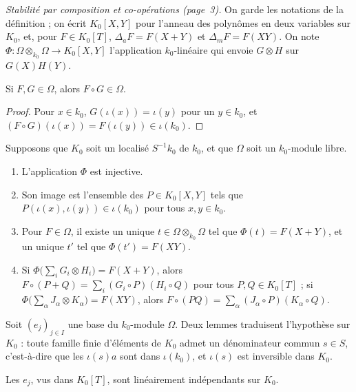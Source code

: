 \medskip
\noindent\textit{Stabilité par composition et co-opérations (page~3).} On garde les notations de la définition ; on écrit $K_0[X, Y]$ pour l'anneau des polynômes en deux variables sur $K_0$, et, pour $F \in K_0[T]$, $\Delta_a F = F(X + Y)$ et $\Delta_m F = F(XY)$. On note $\Phi : \Omega \otimes_{k_0} \Omega \to K_0[X, Y]$ l'application $k_0$-linéaire qui envoie $G \otimes H$ sur $G(X) H(Y)$.

\begin{enonce}
Si $F, G \in \Omega$, alors $F \circ G \in \Omega$.
\end{enonce}

\begin{proof}
Pour $x \in k_0$, $G(\iota(x)) = \iota(y)$ pour un $y \in k_0$, et $(F \circ G)(\iota(x)) = F(\iota(y)) \in \iota(k_0)$.
\end{proof}

\begin{enonce}
Supposons que $K_0$ soit un localisé $S^{-1} k_0$ de $k_0$, et que $\Omega$ soit un $k_0$-module libre.
\begin{enumerate}
\item L'application $\Phi$ est injective.
\item Son image est l'ensemble des $P \in K_0[X, Y]$ tels que $P(\iota(x), \iota(y)) \in \iota(k_0)$ pour tous $x, y \in k_0$.
\item Pour $F \in \Omega$, il existe un unique $t \in \Omega \otimes_{k_0} \Omega$ tel que $\Phi(t) = F(X + Y)$, et un unique $t'$ tel que $\Phi(t') = F(XY)$.
\item Si $\Phi\bigl(\sum_i G_i \otimes H_i\bigr) = F(X + Y)$, alors $F \circ (P + Q) = \sum_i (G_i \circ P)(H_i \circ Q)$ pour tous $P, Q \in K_0[T]$ ; si $\Phi\bigl(\sum_\alpha J_\alpha \otimes K_\alpha\bigr) = F(XY)$, alors $F \circ (PQ) = \sum_\alpha (J_\alpha \circ P)(K_\alpha \circ Q)$.
\end{enumerate}
\end{enonce}

Soit $(e_j)_{j \in I}$ une base du $k_0$-module $\Omega$. Deux lemmes traduisent l'hypothèse sur $K_0$ : toute famille finie d'éléments de $K_0$ admet un dénominateur commun $s \in S$, c'est-à-dire que les $\iota(s) a$ sont dans $\iota(k_0)$, et $\iota(s)$ est inversible dans $K_0$.

\begin{lemme}\label{lem:153-indep}
Les $e_j$, vus dans $K_0[T]$, sont linéairement indépendants sur $K_0$.
\end{lemme}

